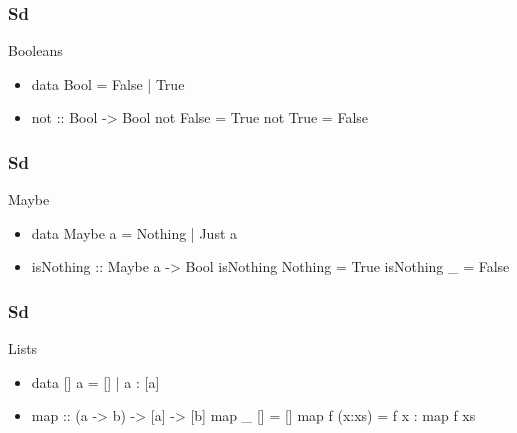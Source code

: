 \documentclass{beamer}
\begin{document}

\begin{frame}[fragile]
  \frametitle{Sd}

  \begin{block}{Booleans}
    \begin{itemize}
    \item
      \begin{code}
data Bool = False | True
      \end{code}
    \item
      \begin{code}
not :: Bool -> Bool
not False = True
not True  = False
      \end{code}
    \end{itemize}
  \end{block}
\end{frame}

\begin{frame}[fragile]
  \frametitle{Sd}

  \begin{block}{Maybe}
    \begin{itemize}
    \item
      \begin{code}
data Maybe a = Nothing | Just a
      \end{code}
    \item
      \begin{code}
isNothing :: Maybe a -> Bool
isNothing Nothing = True
isNothing _       = False
      \end{code}
    \end{itemize}
  \end{block}
\end{frame}

\begin{frame}[fragile]
  \frametitle{Sd}

  \begin{block}{Lists}
    \begin{itemize}
    \item
      \begin{code}
data [] a = [] | a : [a]
      \end{code}
    \item
      \begin{code}
map :: (a -> b) -> [a] -> [b]
map _ []     = []
map f (x:xs) = f x : map f xs
      \end{code}
    \end{itemize}
  \end{block}
\end{frame}
\end{document}
